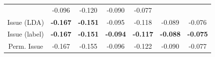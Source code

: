 \begin{table}
\begin{tabular}{|c|cccccc|}
    & \hspace{-4pt} -0.096 \hspace{-5pt}
    & \hspace{-4pt} -0.120 \hspace{-5pt}
    & \hspace{-4pt} -0.090 \hspace{-5pt}
    & \hspace{-4pt} -0.077 \hspace{-4pt} \\
    Issue (LDA)
    & \hspace{-4pt} \textbf{-0.167} \hspace{-5pt}
    & \hspace{-4pt} \textbf{-0.151} \hspace{-5pt}
    & \hspace{-4pt} -0.095 \hspace{-5pt}
    & \hspace{-4pt} -0.118 \hspace{-5pt}
    & \hspace{-4pt} -0.089 \hspace{-5pt}
    & \hspace{-4pt} -0.076 \hspace{-4pt} \\
    Issue (label)
    & \hspace{-4pt} \textbf{-0.167} \hspace{-5pt}
    & \hspace{-4pt} \textbf{-0.151} \hspace{-5pt}
    & \hspace{-4pt} \textbf{-0.094} \hspace{-5pt}
    & \hspace{-4pt} \textbf{-0.117} \hspace{-5pt}
    & \hspace{-4pt} \textbf{-0.088} \hspace{-5pt}
    & \hspace{-4pt} \textbf{-0.075} \hspace{-4pt} \\
    \hspace{-5pt} Perm. Issue \hspace{-5pt}
    & \hspace{-4pt} -0.167 \hspace{-5pt}
    & \hspace{-4pt} -0.155 \hspace{-5pt}
    & \hspace{-4pt} -0.096 \hspace{-5pt}
    & \hspace{-4pt} -0.122 \hspace{-5pt}
    & \hspace{-4pt} -0.090 \hspace{-5pt}
    & \hspace{-4pt} -0.077 \hspace{-4pt} \\
    \hline
  \end{tabular}
  \normalsize
  \label{table:session_comparison}
\end{table}

